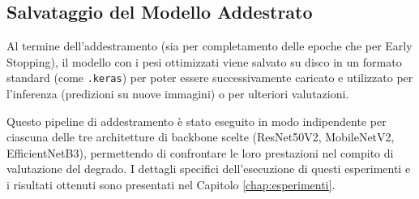 \subsection{Salvataggio del Modello Addestrato}

Al termine dell'addestramento (sia per completamento delle epoche che per Early Stopping), il modello con i pesi ottimizzati viene salvato su disco in un formato standard (come \texttt{.keras}) per poter essere successivamente caricato e utilizzato per l'inferenza (predizioni su nuove immagini) o per ulteriori valutazioni.

Questo pipeline di addestramento è stato eseguito in modo indipendente per ciascuna delle tre architetture di backbone scelte (ResNet50V2, MobileNetV2, EfficientNetB3), permettendo di confrontare le loro prestazioni nel compito di valutazione del degrado. I dettagli specifici dell'esecuzione di questi esperimenti e i risultati ottenuti sono presentati nel Capitolo \ref{chap:esperimenti}.
